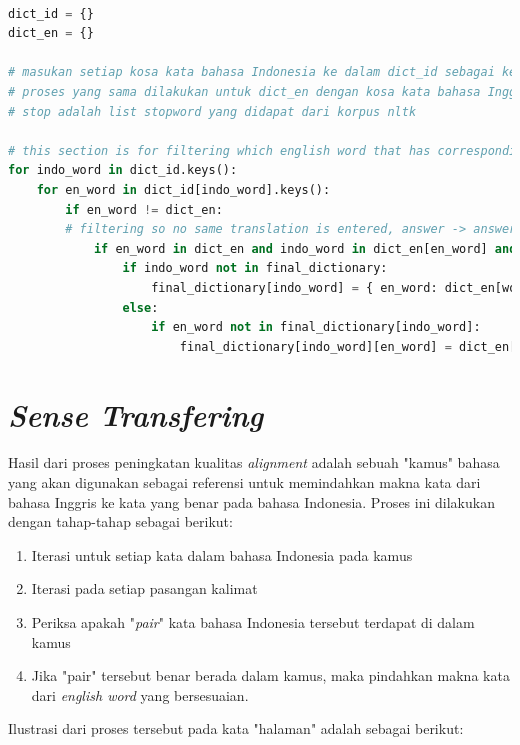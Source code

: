 \begin{lstlisting}[language=Python, caption={Word Alignment Enhancement}, label={word-alignment-enhancement}]

dict_id = {}
dict_en = {}

# masukan setiap kosa kata bahasa Indonesia ke dalam dict_id sebagai key dan kumpulan pasangan kata bahasa inggrisnya sebagai value
# proses yang sama dilakukan untuk dict_en dengan kosa kata bahasa Inggris sebagai key dan kumpulan pasangan kata bahasa Indonesia sebagai value
# stop adalah list stopword yang didapat dari korpus nltk

# this section is for filtering which english word that has corresponding indo translation (bidirectional) from Giza output
for indo_word in dict_id.keys():
	for en_word in dict_id[indo_word].keys():
		if en_word != dict_en:
		# filtering so no same translation is entered, answer -> answer, jawaban -> jawaban
			if en_word in dict_en and indo_word in dict_en[en_word] and en_word not in stop:
				if indo_word not in final_dictionary:
					final_dictionary[indo_word] = { en_word: dict_en[word_en][word_id] }
				else:
					if en_word not in final_dictionary[indo_word]:
						final_dictionary[indo_word][en_word] = dict_en[word_en][word_id]
\end{lstlisting}



\section{\textit{Sense Transfering}}
Hasil dari proses peningkatan kualitas \textit{alignment} adalah sebuah "kamus" bahasa yang akan digunakan sebagai referensi untuk memindahkan makna kata dari bahasa Inggris ke kata yang benar pada bahasa Indonesia. Proses ini dilakukan dengan tahap-tahap sebagai berikut:

\begin{enumerate}
	\item Iterasi untuk setiap kata dalam bahasa Indonesia pada kamus
	\item Iterasi pada setiap pasangan kalimat
	\item Periksa apakah "\textit{pair}" kata bahasa Indonesia tersebut terdapat di dalam kamus
	\item Jika "pair" tersebut benar berada dalam kamus, maka pindahkan makna kata dari \textit{english word} yang bersesuaian.
\end{enumerate}

Ilustrasi dari proses tersebut pada kata "halaman" adalah sebagai berikut:

